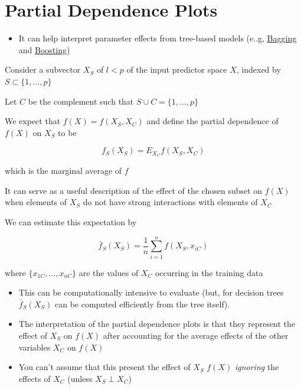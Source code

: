 \documentclass[
]{book}
\providecommand{\tightlist}{%
  \setlength{\itemsep}{0pt}\setlength{\parskip}{0pt}}
\begin{document}
\hypertarget{partial-dependence-plots}{%
\section{Partial Dependence Plots}\label{partial-dependence-plots}}

\begin{itemize}
\tightlist
\item
  It can help interpret parameter effects from tree-based models (e..g, \protect\hyperlink{bagging}{Bagging} and \protect\hyperlink{boosting}{Boosting})
\end{itemize}

Consider a subvector \(X_S\) of \(l < p\) of the input predictor space \(X\), indexed by \(S \subset \{ 1, \dots, p \}\)

Let \(C\) be the complement such that \(S \cup C = \{1, \dots, p \}\)

We expect that \(f(X) = f(X_S, X_C)\) and define the partial dependence of \(f(X)\) on \(X_S\) to be

\[
f_S(X_S) = E_{X_C} f(X_S, X_C)
\]

which is the marginal average of \(f\)

It can serve as a useful description of the effect of the chosen subset on \(f(X)\) when elements of \(X_S\) do not have strong interactions with elements of \(X_C\)

We can estimate this expectation by

\[
\bar{f}_S(X_S) = \frac{1}{n} \sum_{i=1}^n f(X_S, x_{iC})
\]

where \(\{ x_{1C}, \dots, x_{nC}\}\) are the values of \(X_C\) occurring in the training data

\begin{itemize}
\tightlist
\item
  This can be computationally intensive to evaluate (but, for decision trees \(\bar{f}_S(X_S)\) can be computed efficiently from the tree itself).
\end{itemize}

\begin{itemize}
\item
  The interpretation of the partial dependence plots is that they represent the effect of \(X_S\) on \(f(X)\) after accounting for the average effects of the other variables \(X_C\) on \(f(X)\)
\item
  You can't assume that this present the effect of \(X_S\) \(f(X)\) \emph{ignoring} the effects of \(X_C\) (unless \(X_S \perp X_C\))
\end{itemize}
\end{document}
